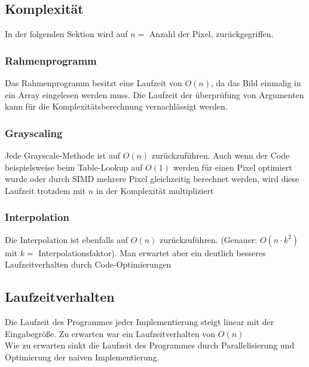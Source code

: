 \documentclass[course=erap]{aspdoc}
\begin{document}
\subsection{Komplexität}
In der folgenden Sektion wird auf $n =$ Anzahl der Pixel, zurückgegriffen.

\subsubsection{Rahmenprogramm}
Das Rahmenprogramm besitzt eine Laufzeit von $O(n)$, da das Bild einmalig in ein Array eingelesen werden muss. Die Laufzeit der überprüfung von Argumenten kann für die Komplexitätsberechnung vernachlässigt werden.

\subsubsection{Grayscaling}
Jede Grayscale-Methode ist auf $O(n)$ zurückzuführen. Auch wenn der Code beispielsweise beim Table-Lookup auf $O(1)$ werden für einen Pixel optimiert wurde oder durch SIMD mehrere Pixel gleichzeitig berechnet werden, wird diese Laufzeit trotzdem mit $n$ in der Komplexität multipliziert

\subsubsection{Interpolation}
Die Interpolation ist ebenfalls auf $O(n)$ zurückzuführen. (Genauer: $O(n \cdot k^{2})$ mit $k =$ Interpolationsfaktor). Man erwartet aber ein deutlich besseres Laufzeitverhalten durch Code-Optimierungen

\subsection{Laufzeitverhalten}
Die Laufzeit des Programmes jeder Implementierung steigt linear mit der Eingabegröße. Zu erwarten war ein Laufzeitverhalten von $O(n)$\\
Wie zu erwarten sinkt die Laufzeit des Programmes durch Parallelisierung und Optimierung der naiven Implementierung.
\end{document}
